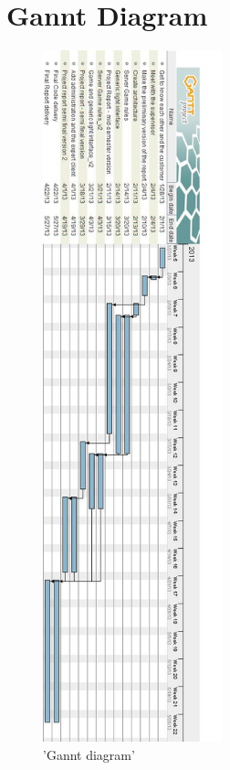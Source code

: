 

\appendix
\renewcommand{\thesection}{\arabic{section}}

\chapter{Gannt Diagram}
\label{appendix:A}

\begin{figure}[H]
  \centering
    \includegraphics[height=20cm]{img/ganttv3v2.jpg}
  \caption{ 'Gannt diagram'} 
  \label{fig:ganntDiagram}
\end{figure}






